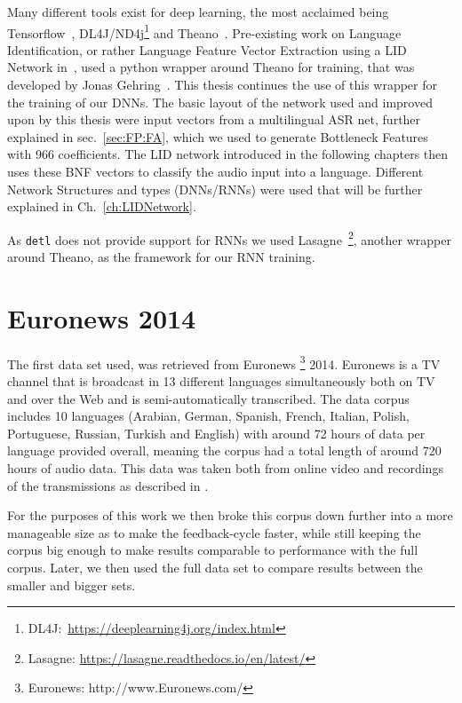 Many different tools exist for deep learning, the most acclaimed being Tensorflow~\cite{DBLP:journals/corr/AbadiABBCCCDDDG16}, DL4J/ND4j\footnote{DL4J:~\url{https://deeplearning4j.org/index.html}} and Theano~\cite{bergstra2011theano}. Pre-existing work on Language Identification, or rather Language Feature Vector Extraction using a LID Network in~\cite{Mueller2016b}, used a python wrapper around Theano for training, that was developed by Jonas Gehring~\cite{gehringMA}. This thesis continues the use of this wrapper for the training of our DNNs. The basic layout of the network used and improved upon by this thesis were input vectors from a multilingual ASR net, further explained in sec.~\ref{sec:FP:FA}, which we used to generate Bottleneck Features with 966 coefficients. The LID network introduced in the following chapters then uses these BNF vectors to classify the audio input into a language. Different Network Structures and types (DNNs/RNNs) were used that will be further explained in Ch.~\ref{ch:LIDNetwork}. 

As \texttt{detl} does not provide support for RNNs we used Lasagne~\footnote{Lasagne: \url{https://lasagne.readthedocs.io/en/latest/}}, another wrapper around Theano, as the framework for our RNN training.

\section{Euronews 2014}
\label{sec:LITasks:Euronews}


The first data set used, was retrieved from Euronews \footnote{Euronews: http://www.Euronews.com/} 2014. Euronews is a TV channel that is broadcast in 13 different languages simultaneously both on TV and over the Web and is semi-automatically transcribed. The data corpus includes 10 languages (Arabian, German, Spanish, French, Italian, Polish, Portuguese, Russian, Turkish and English) with around 72 hours of data per language provided overall, meaning the corpus had a total length of around 720 hours of audio data. This data was taken both from online video and recordings of the transmissions as described in \cite{gretter2014Euronews}.

For the purposes of this work we then broke this corpus down further into a more manageable size as to make the feedback-cycle faster, while still keeping the corpus big enough to make results comparable to performance with the full corpus. Later, we then used the full data set to compare results between the smaller and bigger sets.

